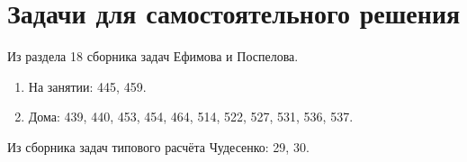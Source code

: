 \section*{Задачи для самостоятельного решения}

Из раздела 18 сборника задач Ефимова и Поспелова.
\begin{enumerate}
    \item На занятии: 445, 459.
    \item Дома: 439, 440, 453, 454, 464, 514, 522, 527, 531, 536, 537.
\end{enumerate}

Из сборника задач типового расчёта Чудесенко: 29, 30.
